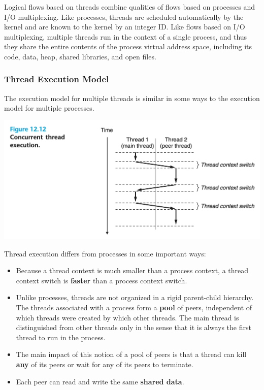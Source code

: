 \documentclass[11pt]{article}
\begin{document}
Logical flows based on threads combine qualities of flows based on processes and I/O multiplexing. Like processes, threads are scheduled automatically by the kernel and are known to the kernel by an integer ID. Like flows based on I/O multiplexing, multiple threads run in the context of a single process, and thus they share the entire contents of the process virtual address space, including its code, data, heap, shared libraries, and open files.\\


\subsubsection{Thread Execution Model}
\label{sec:org927af56}
The execution model for multiple threads is similar in some ways to the execution model for multiple processes.\\


\begin{center}
\includegraphics[width=.9\linewidth]{pics/figure12.12-concurrent-thread-execution.png}
\end{center}


Thread execution differs from processes in some important ways:\\
\begin{itemize}
\item Because a thread context is much smaller than a process context, a thread context switch is \textbf{faster} than a process context switch.\\
\item Unlike processes, threads are not organized in a rigid parent-child hierarchy. The threads associated with a process form a \textbf{pool} of peers, independent of which threads were created by which other threads. The main thread is distinguished from other threads only in the sense that it is always the first thread to run in the process.\\
\item The main impact of this notion of a pool of peers is that a thread can kill \textbf{any} of its peers or wait for any of its peers to terminate.\\
\item Each peer can read and write the same \textbf{shared data}.\\
\end{itemize}
\end{document}
